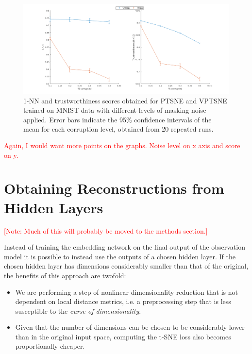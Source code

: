 \begin{figure}[!htb]
  \centering
  \includegraphics[width=\textwidth]{images/corrupted.png}
  \caption{ 1-NN and trustworthiness scores obtained for PTSNE and VPTSNE trained on MNIST data with different levels of masking noise applied. Error bars indicate the 95\% confidence intervals of the mean for each corruption level, obtained from 20 repeated runs.}
  \label{fig:corrupted_data}
\end{figure}

\textcolor{red}{ Again, I would want more points on the graphs. Noise level on x axis and score on y. }

\section{Obtaining Reconstructions from Hidden Layers}

\textcolor{red}{[Note: Much of this will probably be moved to the methods section.]}

Instead of training the embedding network on the final output of the observation model it is possible to instead use the outputs of a chosen hidden layer. If the chosen hidden layer has dimensions considerably smaller than that of the original, the benefits of this approach are twofold:

\begin{itemize}
\item We are performing a step of nonlinear dimensionality reduction that is not dependent on local distance metrics, i.e. a preprocessing step that is less susceptible to the \textit{curse of dimensionality}.
\item Given that the number of dimensions can be chosen to be considerably lower than in the original input space, computing the t-SNE loss also becomes proportionally cheaper.
\end{itemize}

